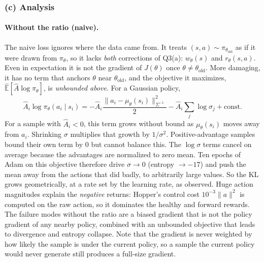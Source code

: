 \documentclass[11pt]{article}
\newcommand{\piold}{\pi_{\theta_{\mathrm{old}}}}
\newcommand{\Ahat}{\hat{A}}
\newcommand{\Ehat}{\hat{\mathbb{E}}}
\begin{document}
\subsubsection*{(c) Analysis}

\paragraph{Without the ratio (naive).}
The naive loss ignores where the data came from. It treats $(s,a)\sim\piold$ as if it were drawn from
$\pi_\theta$, so it lacks \emph{both} corrections of Q3(a): $w_\theta(s)$ and $r_\theta(s,a)$. Even in
expectation it is not the gradient of $J(\theta)$ once $\theta\neq\theta_{\mathrm{old}}$. More
damaging, it has no term that anchors $\theta$ near $\theta_{\mathrm{old}}$, and the objective it maximizes,
$\Ehat[\Ahat\log\pi_\theta]$, is \emph{unbounded above}. For a Gaussian policy,
\[
  \Ahat_i\log\pi_\theta(a_i\mid s_i) = -\Ahat_i\frac{\|a_i-\mu_\theta(s_i)\|^2_{\Sigma^{-1}}}{2}
  - \Ahat_i\sum_j\log\sigma_j + \text{const}.
\]
For a sample with $\Ahat_i<0$, this term grows without bound as $\mu_\theta(s_i)$ moves away
from $a_i$. Shrinking $\sigma$ multiplies that growth by $1/\sigma^2$. Positive-advantage samples bound their own term
by $0$ but cannot balance this. The $\log\sigma$ terms cancel on average because the advantages are normalized
to zero mean. Ten epochs of Adam on this objective therefore drive $\sigma\to0$
(entropy $\to-17$) and push the mean away from the actions that did badly, to arbitrarily large values. So the KL grows
geometrically, at a rate set by the learning rate, as observed. Huge action magnitudes explain the
\emph{negative} returns: Hopper's control cost $10^{-3}\|a\|^2$ is computed on the raw action, so it
dominates the healthy and forward rewards. The failure modes without the ratio are a biased gradient that is not
the policy gradient of any nearby policy, combined with an unbounded objective that leads to divergence and entropy
collapse. Note that the gradient is never weighted by how likely the sample is under the current
policy, so a sample the current policy would never generate still produces a full-size gradient.
\end{document}

